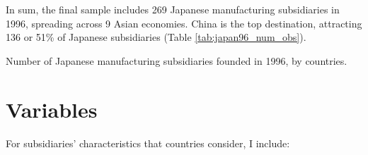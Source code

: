 In sum, the final sample includes 269 Japanese manufacturing subsidiaries in 1996, spreading
across 9 Asian economies. China is the top destination, attracting 136 or 51\%
of Japanese subsidiaries (Table \ref{tab:japan96_num_obs}).

\begin{table}[tbp]
  \centering
  \caption[Number of Japanese manufacturing subsidiaries founded in 1996, by
  countries.]{Number of Japanese manufacturing subsidiaries founded in 1996, by countries.}
  \label{tab:japan96_num_obs}
  
\end{table}

\section{Variables}
\label{sec:Japan_variables}

For subsidiaries' characteristics that countries consider, I include:

